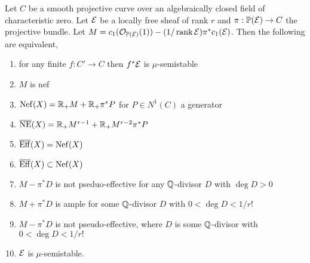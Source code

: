 \documentclass[12pt]{article}
\begin{document}
\begin{prop}
Let $C$ be a smooth projective curve over an algebraically closed field of characteristic zero. Let $\mathcal{E}$ be a locally free sheaf of rank $r$ and $\pi : \mathbb{P}(\mathcal{E}) \to C$ the projective bundle. Let $M = c_1(\mathcal{O}_{\mathbb{P}(\mathcal{E})}(1)) - (1/\operatorname{\mathrm{rank}}{\mathcal{E}}) \pi^* c_1(\mathcal{E})$. Then the following are equivalent,
\begin{enumerate}
\item for any finite $f : C' \to C$ then $f^* \mathcal{E}$ is $\mu$-semistable
\item $M$ is nef
\item $\mathrm{Nef}(X) = \mathbb{R}_{+} M + \mathbb{R}_{+} \pi^* P$  for $P \in N^1(C)$ a generator
\item $\overline{\mathrm{NE}}(X) = \mathbb{R}_{+} M^{r-1} + \mathbb{R}_{+} M^{r-2} \pi^* P$
\item $\overline{\mathrm{Eff}}(X) = \mathrm{Nef}(X)$
\item $\overline{\mathrm{Eff}}(X) \subset \mathrm{Nef}(X)$
\item $M - \pi^* D$ is not pseduo-effective for any $\mathbb{Q}$-divisor $D$ with $\deg{D} > 0$
\item $M + \pi^* D$ is ample for some $\mathbb{Q}$-divisor $D$ with $0 < \deg{D} < 1/r!$
\item $M - \pi^* D$ is not pseudo-effective, where $D$ is some $\mathbb{Q}$-divisor with $0 < \deg{D} < 1/r!$
\item $\mathcal{E}$ is $\mu$-semistable.
\end{enumerate}
\end{prop}
\end{document}
